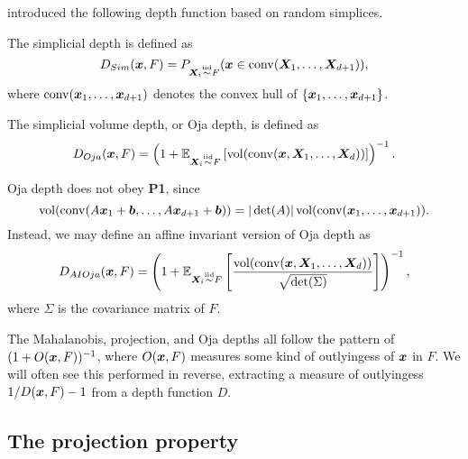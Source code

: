 \textcite{liu-1990} introduced the following depth function based on random
simplices.

\begin{definition}
    The simplicial depth is defined as
    \begin{equation}
        D_{Sim}(\bm{x}, F) = P_{\bm{X}_i \overset{\text{iid}}{\sim} F}(\bm{x} \in \operatorname{conv}(\bm{X}_1, \dots, \bm{X}_{d + 1})), \label{eq:simplicial}
    \end{equation}
    where $\operatorname{conv}(\bm{x}_1, \dots, \bm{x}_{d + 1})$ denotes the convex hull of
    $\{\bm{x}_1, \dots, \bm{x}_{d + 1}\}$.
\end{definition}

\begin{definition}
    The simplicial volume depth, or Oja depth, is defined as
    \begin{equation}
        D_{Oja}(\bm{x}, F) = \left(1 + \operatorname{\mathbb{E}}_{\bm{X}_i \overset{\text{iid}}{\sim} F}\left[\operatorname{vol}(\operatorname{conv}(\bm{x}, \bm{X}_1, \dots, \bm{X}_d))\right]\right)^{-1}.
    \end{equation}
\end{definition}

\begin{remark}
    Oja depth does not obey \textbf{P1}, since
    \begin{equation}
        \operatorname{vol}(\operatorname{conv}(A\bm{x}_1 + \bm{b}, \dots, A\bm{x}_{d + 1} + \bm{b})) = |\det(A)| \operatorname{vol}(\operatorname{conv}(\bm{x}_1, \dots, \bm{x}_{d + 1})).
    \end{equation}
    Instead, we may define an affine invariant version of Oja depth as
    \begin{equation}
        D_{AIOja}(\bm{x}, F) = \left(1 + \operatorname{\mathbb{E}}_{\bm{X}_i \overset{\text{iid}}{\sim} F}\left[\frac{\operatorname{vol}(\operatorname{conv}(\bm{x}, \bm{X}_1, \dots, \bm{X}_d))}{\sqrt{\det(\Sigma)}}\right]\right)^{-1},
    \end{equation}
    where $\Sigma$ is the covariance matrix of $F$.
\end{remark}


\begin{remark}
    The Mahalanobis, projection, and Oja depths all follow the pattern of $(1
    + O(\bm{x}, F))^{-1}$, where $O(\bm{x}, F)$ measures some kind of outlyingess of
    $\bm{x}$ in $F$.
    We will often see this performed in reverse, extracting a measure of
    outlyingess $1/D(\bm{x}, F) - 1$ from a depth function $D$.
\end{remark}


\subsection{The projection property}


